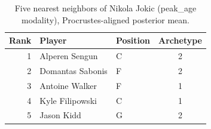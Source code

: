 \begin{table}[htbp]
  \centering\small
  \begin{tabular}{rllc}
    \toprule
    Rank & Player & Position & Archetype \\
    \midrule
    1 & Alperen Sengun & C & 2 \\
    2 & Domantas Sabonis & F & 2 \\
    3 & Antoine Walker & F & 1 \\
    4 & Kyle Filipowski & C & 1 \\
    5 & Jason Kidd & G & 2 \\
    \bottomrule
  \end{tabular}
  \caption{Five nearest neighbors of Nikola Jokic (peak_age modality), Procrustes-aligned posterior mean.}
  \label{tab:Nikola_Jokic_neighbors_peak_age}
\end{table}

